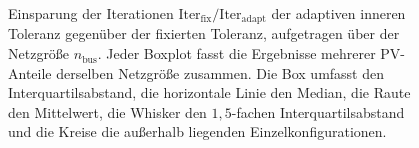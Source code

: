 

\begin{figure}[H]
	\centering
	
	\caption{Einsparung der Iterationen
		$\mathrm{Iter}_\mathrm{fix}/\mathrm{Iter}_\mathrm{adapt}$ der adaptiven
		inneren Toleranz gegenüber der fixierten Toleranz, aufgetragen über der
		Netzgröße $n_\mathrm{bus}$. Jeder Boxplot fasst die Ergebnisse mehrerer
		PV-Anteile derselben Netzgröße zusammen. Die Box umfasst den
		Interquartilsabstand, die horizontale Linie den Median, die Raute den
		Mittelwert, die Whisker den $1{,}5$-fachen Interquartilsabstand und die
		Kreise die außerhalb liegenden Einzelkonfigurationen.}
	\label{fig:salazar_adaptive_speedup}
\end{figure}



